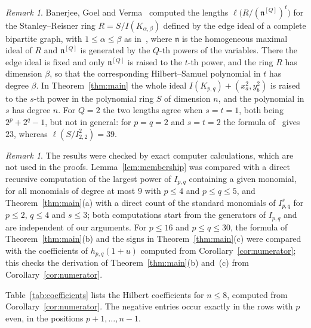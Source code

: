 \documentclass{amsart}
\theoremstyle{definition}
\theoremstyle{remark}
\newtheorem{remark}[theorem]{Remark}
\numberwithin{equation}{section}
\begin{document}
\begin{remark}\label{rem:bgv}
Banerjee, Goel and Verma~\cite[Theorem~3.3, Example~3.11]{BGV} computed the
lengths $\ell\bigl(R/(\mathfrak n^{[Q]})^t\bigr)$ for the Stanley--Reisner
ring $R=S/I(K_{\alpha,\beta})$ defined by the edge ideal of a complete bipartite
graph, with $1\le\alpha\le\beta$ as in~\cite{BGV},
where $\mathfrak n$ is the homogeneous maximal ideal of $R$ and $\mathfrak
n^{[Q]}$ is generated by the $Q$-th powers of the variables. There the edge
ideal is fixed and only $\mathfrak n^{[Q]}$ is raised to the $t$-th power, and
the ring $R$ has dimension $\beta$, so that the corresponding Hilbert--Samuel
polynomial in $t$ has degree $\beta$. In Theorem~\ref{thm:main} the whole ideal
$I(K_{p,q})+(x_a^2,y_b^2)$ is raised to the $s$-th power in the polynomial ring
$S$ of dimension $n$, and the polynomial in $s$ has degree $n$. For $Q=2$ the
two lengths agree when $s=t=1$, both being $2^p+2^q-1$, but not in general: for
$p=q=2$ and $s=t=2$ the formula
of~\cite[Example~3.11]{BGV} gives $23$, whereas $\ell(S/I_{2,2}^2)=39$.
\end{remark}

\begin{remark}\label{rem:computations}
The results were checked by exact computer calculations, which are not used in
the proofs. Lemma~\ref{lem:membership} was compared with a direct recursive
computation of the largest power of $I_{p,q}$ containing a given monomial, for
all monomials of degree at most $9$ with $p\le4$ and $p\le q\le5$, and
Theorem~\ref{thm:main}(a) with a direct count of the standard monomials of
$I_{p,q}^s$ for $p\le2$, $q\le4$ and $s\le3$; both computations start from the
generators of $I_{p,q}$ and are independent of our arguments. For $p\le16$ and
$p\le q\le30$, the formula of Theorem~\ref{thm:main}(b) and the signs in
Theorem~\ref{thm:main}(c) were compared with the coefficients of
$h_{p,q}(1+u)$ computed from Corollary~\ref{cor:numerator}; this checks the
derivation of Theorem~\ref{thm:main}(b) and~(c) from
Corollary~\ref{cor:numerator}.
\end{remark}

Table~\ref{tab:coefficients} lists the Hilbert coefficients for $n\le8$,
computed from Corollary~\ref{cor:numerator}. The
negative entries occur exactly in the rows with $p$ even, in the positions
$p+1,\dots,n-1$.
\end{document}
